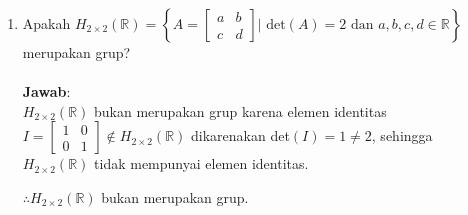 \documentclass{article}
\begin{document}
\begin{enumerate}
    \item Apakah $H_{2\times 2}(\mathbb{R})=\left\{A=\begin{bmatrix}a&b\\c&d\end{bmatrix}\Big|\textrm{ det}(A)=2 \textrm{ dan }a,b,c,d\in\mathbb{R} \right\}$ merupakan grup?\\~\\
    \textbf{Jawab}:\\
    $H_{2\times 2}(\mathbb{R})$ bukan merupakan grup karena elemen identitas $I=\begin{bmatrix}1&0\\0&1\end{bmatrix}\notin H_{2\times 2}(\mathbb{R})$ dikarenakan det$(I)=1\neq2$, sehingga $H_{2\times 2}(\mathbb{R})$ tidak mempunyai elemen identitas.
    
    \vspace{0.1mm}
    $\therefore H_{2\times 2}(\mathbb{R})$ bukan merupakan grup.
\end{enumerate}
\end{document}
